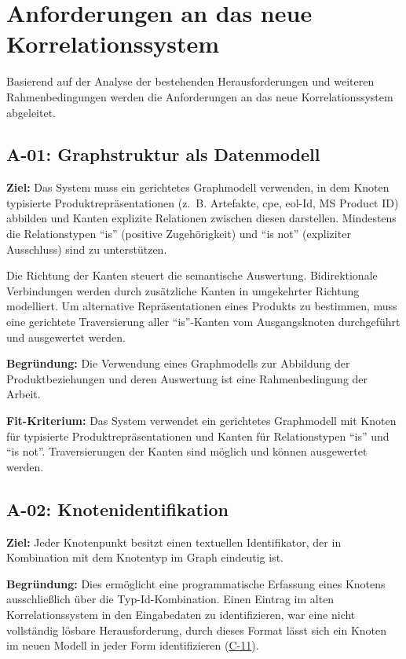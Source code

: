 \section{Anforderungen an das neue Korrelationssystem}\label{sec:requirements}

Basierend auf der Analyse der bestehenden Herausforderungen und weiteren Rahmenbedingungen werden die Anforderungen an das neue Korrelationssystem abgeleitet.

\subsection{A-01: Graphstruktur als Datenmodell}\label{subsec:req-format-product-graph}

\textbf{Ziel:}
Das System muss ein gerichtetes Graphmodell verwenden, in dem Knoten typisierte Produktrepräsentationen (z.\ B. Artefakte, \acrshort{cpe}, \acrshort{eol}-Id, MS Product ID) abbilden und Kanten explizite Relationen zwischen diesen darstellen.
Mindestens die Relationstypen \enquote{is} (positive Zugehörigkeit) und \enquote{is not} (expliziter Ausschluss) sind zu unterstützen.

Die Richtung der Kanten steuert die semantische Auswertung.
Bidirektionale Verbindungen werden durch zusätzliche Kanten in umgekehrter Richtung modelliert.
Um alternative Repräsentationen eines Produkts zu bestimmen, muss eine gerichtete Traversierung aller \enquote{is}-Kanten vom Ausgangsknoten durchgeführt und ausgewertet werden.

\textbf{Begründung:}
Die Verwendung eines Graphmodells zur Abbildung der Produktbeziehungen und deren Auswertung ist eine Rahmenbedingung der Arbeit.

\textbf{Fit-Kriterium:}
Das System verwendet ein gerichtetes Graphmodell mit Knoten für typisierte Produktrepräsentationen und Kanten für Relationstypen \enquote{is} und \enquote{is not}.
Traversierungen der Kanten sind möglich und können ausgewertet werden.

\subsection{A-02: Knotenidentifikation}\label{subsec:req-node-id-type}

\textbf{Ziel:}
Jeder Knotenpunkt besitzt einen textuellen Identifikator, der in Kombination mit dem Knotentyp im Graph eindeutig ist.

\textbf{Begründung:}
Dies ermöglicht eine programmatische Erfassung eines Knotens ausschließlich über die Typ-Id-Kombination.
Einen Eintrag im alten Korrelationssystem in den Eingabedaten zu identifizieren, war eine nicht vollständig lösbare Herausforderung, durch dieses Format lässt sich ein Knoten im neuen Modell in jeder Form identifizieren (\hyperref[subsec:c-11-finding-yaml-entries]{C-11}).

